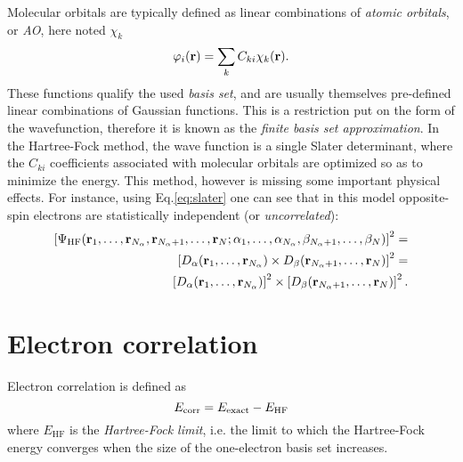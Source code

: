 \documentclass[./thesis.tex]{subfiles}
\begin{document}
Molecular orbitals are typically defined as linear combinations of \emph{atomic orbitals}, or \emph{AO}, here noted $\chi_k$
\begin{equation}
 \varphi_i({\bf r}) = \sum_k C_{ki} \chi_k({\bf r}).
\label{eq:def_mo}
\end{equation}
These functions qualify the used \emph{basis set}, and are usually themselves pre-defined linear combinations of Gaussian functions. This is a restriction put on the form of the wavefunction, therefore it is known as the \emph{finite basis set approximation}.
In the Hartree-Fock method, the wave function is a single Slater determinant, where the $C_{ki}$ coefficients associated with molecular orbitals are optimized so as to minimize the energy.
This method, however is missing some important physical effects. For instance, using Eq.\eqref{eq:slater} one can see that in this model opposite-spin electrons are statistically independent (or \emph{uncorrelated}):
\begin{equation}
\begin{split}
\left[ \Psi_\textrm{HF}({\bf r}_1,\dots,{\bf r}_{{N_\alpha}},{\bf r}_{{N_\alpha}+1},\dots,{\bf r}_N;
      \alpha_1,\dots,\alpha_{{N_\alpha}},\beta_{{N_\alpha}+1},\dots,\beta_N) \right]^2 = \\
\left[ D_\alpha({\bf r}_1,\dots,{\bf r}_{{N_\alpha}}) \times D_\beta({\bf r}_{{N_\alpha}+1},\dots,{\bf r}_N) \right]^2 = \\
\left[ D_\alpha({\bf r}_1,\dots,{\bf r}_{{N_\alpha}}) \right]^2 \times \left[ D_\beta({\bf r}_{{N_\alpha}+1},\dots,{\bf r}_N) \right]^2.
\end{split}
\end{equation}

\section{Electron correlation}

Electron correlation is defined as\cite{Lowdin_1959}
\begin{equation}
E_\text{corr} = E_\text{exact} - E_\text{HF}
\end{equation}
where $E_\text{HF}$ is the \emph{Hartree-Fock limit}, i.e. the limit to which the Hartree-Fock energy converges when the size of the one-electron basis set increases.
\end{document}
